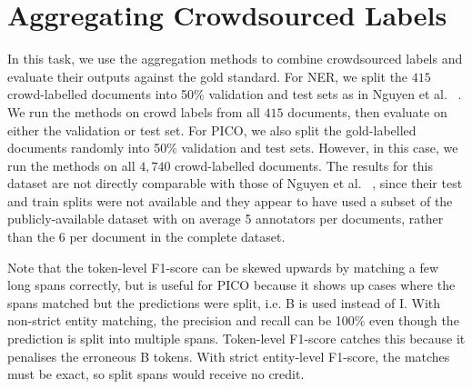 \section{Aggregating Crowdsourced Labels}

In this task, we use the aggregation methods to combine crowdsourced labels and evaluate their outputs against the gold standard.
For NER, we split the $415$ crowd-labelled documents into 50\% validation and test sets as in Nguyen et al. ~. We run the methods on crowd labels from all $415$ documents, then evaluate on either the
validation or test set.
For PICO, we also split the gold-labelled documents randomly into 50\% validation and test sets. However, in this case, we run the methods on all $4,740$ crowd-labelled documents. The results for this dataset are not directly comparable
with those of Nguyen et al. ~, since their test and train splits were not available 
and they appear to have used a subset of the publicly-available dataset with on average 5 annotators per documents, rather than the 6 per document in the complete dataset.





Note that the token-level F1-score can be skewed upwards by matching a few long spans correctly, but is useful for PICO because it shows up cases where the spans matched but the predictions were split, i.e. B is used instead of I. With non-strict entity matching, the precision and recall can be 100\% even though the prediction is split into multiple spans.
Token-level F1-score catches this because it penalises the erroneous B tokens. With strict entity-level F1-score, the matches must be exact, so split spans would receive no credit.

